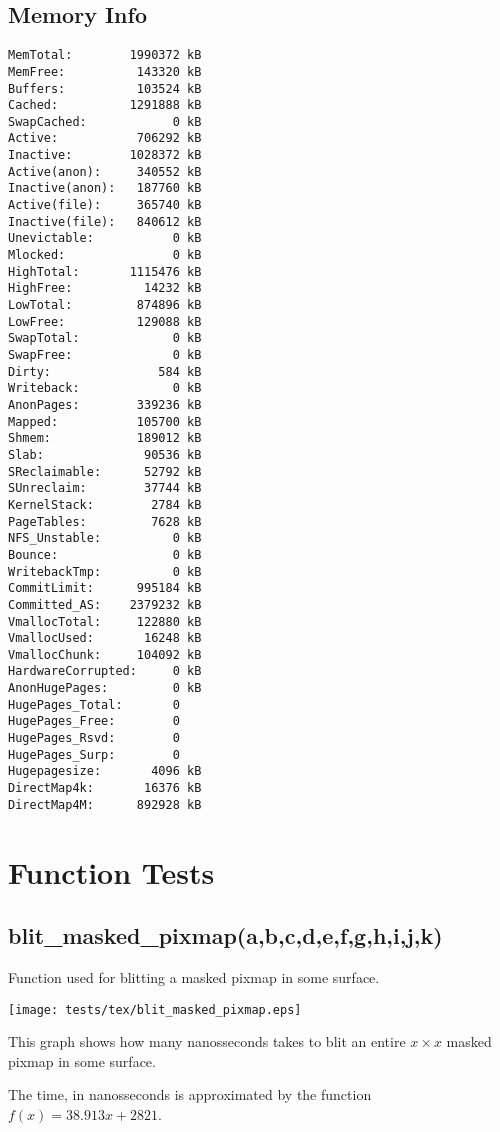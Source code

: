 \documentclass{article}
\begin{document}
\subsection{Memory Info}
\begin{verbatim}
MemTotal:        1990372 kB
MemFree:          143320 kB
Buffers:          103524 kB
Cached:          1291888 kB
SwapCached:            0 kB
Active:           706292 kB
Inactive:        1028372 kB
Active(anon):     340552 kB
Inactive(anon):   187760 kB
Active(file):     365740 kB
Inactive(file):   840612 kB
Unevictable:           0 kB
Mlocked:               0 kB
HighTotal:       1115476 kB
HighFree:          14232 kB
LowTotal:         874896 kB
LowFree:          129088 kB
SwapTotal:             0 kB
SwapFree:              0 kB
Dirty:               584 kB
Writeback:             0 kB
AnonPages:        339236 kB
Mapped:           105700 kB
Shmem:            189012 kB
Slab:              90536 kB
SReclaimable:      52792 kB
SUnreclaim:        37744 kB
KernelStack:        2784 kB
PageTables:         7628 kB
NFS_Unstable:          0 kB
Bounce:                0 kB
WritebackTmp:          0 kB
CommitLimit:      995184 kB
Committed_AS:    2379232 kB
VmallocTotal:     122880 kB
VmallocUsed:       16248 kB
VmallocChunk:     104092 kB
HardwareCorrupted:     0 kB
AnonHugePages:         0 kB
HugePages_Total:       0
HugePages_Free:        0
HugePages_Rsvd:        0
HugePages_Surp:        0
Hugepagesize:       4096 kB
DirectMap4k:       16376 kB
DirectMap4M:      892928 kB
\end{verbatim}
\section{Function Tests}
\subsection{blit\_masked\_pixmap(a,b,c,d,e,f,g,h,i,j,k)}
Function used for blitting a masked pixmap in some surface.

\texttt{[image: tests/tex/blit\_masked\_pixmap.eps]}

This graph shows how many nanosseconds takes to blit an entire $x \times x$ masked pixmap in some surface.

The time, in nanosseconds is 
approximated by the function $f(x)=38.913x+2821$.
\end{document}

